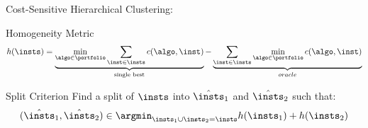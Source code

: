 \begin{frame}[c]{Cost-Sensitive Hierarchical Clustering: \cshc{}\\ }


\begin{block}{Homogeneity Metric}
\begin{equation}
h(\insts) = \underbrace{\min_{\algo \in \portfolio} \sum_{\inst \in \insts} c(\algo, \inst)}_{\text{single best}} - \underbrace{\sum_{\inst \in \insts} \min_{\algo \in \portfolio} c(\algo, \inst)}_{oracle} \nonumber
\end{equation}
\end{block}

\pause

\begin{block}{Split Criterion}
Find a split of $\insts$ into $\hat{\insts}_1$ and $\hat{\insts}_2$ such that:
\begin{equation}
(\hat{\insts}_1,\hat{\insts}_2) \in \argmin_{\insts_1 \cup \insts_2 = \insts} h(\insts_1) + h(\insts_2)\nonumber
\end{equation}
\end{block}

\end{frame}
% 
% 
% 
% 
% 
% 
